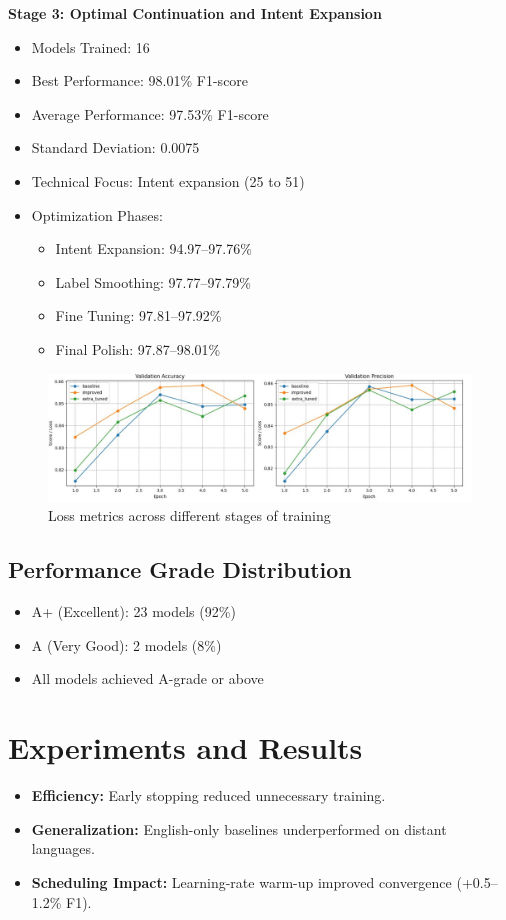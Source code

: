\documentclass{ecai}
\begin{document}
\textbf{Stage 3: Optimal Continuation and Intent Expansion}
\begin{itemize}
    \item Models Trained: 16
    \item Best Performance: 98.01\% F1-score
    \item Average Performance: 97.53\% F1-score
    \item Standard Deviation: 0.0075
    \item Technical Focus: Intent expansion (25 to 51)
    \item Optimization Phases:
    \begin{itemize}
        \item Intent Expansion: 94.97–97.76\%
        \item Label Smoothing: 97.77–97.79\%
        \item Fine Tuning: 97.81–97.92\%
        \item Final Polish: 97.87–98.01\%
    \end{itemize}
\end{itemize}

    \begin{figure}[H]
        \centering
            \includegraphics[width=\linewidth]{training_matrices_3.jpeg}
        \caption{Loss metrics across different stages of training}
        \label{fig:loss_metrics}
    \end{figure}

\subsection{Performance Grade Distribution}
\begin{itemize}
    \item A+ (Excellent): 23 models (92\%)
    \item A (Very Good): 2 models (8\%)
    \item All models achieved A-grade or above
\end{itemize}


\section{Experiments and Results}
\begin{itemize}
    \item \textbf{Efficiency:} Early stopping reduced unnecessary training.
    \item \textbf{Generalization:} English-only baselines underperformed on distant languages.
    \item \textbf{Scheduling Impact:} Learning-rate warm-up improved convergence (+0.5–1.2\% F1).
\end{itemize}
\end{document}
